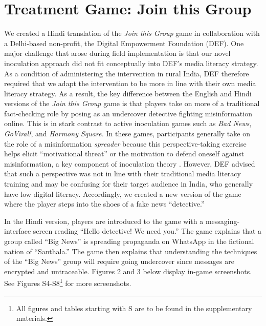 \documentclass[empirical, authordate]{jote-new-article}
\begin{document}
\section{Treatment Game: Join this Group}

We created a Hindi translation of the \emph{Join this Group} game in collaboration with a Delhi-based non-profit, the Digital Empowerment Foundation (DEF). One major challenge that arose during field implementation is that our novel inoculation approach did not fit conceptually into DEF's media literacy strategy. As a condition of administering the intervention in rural India, DEF therefore required that we adapt the intervention to be more in line with their own media literacy strategy. As a result,\emph{ }the key difference between the English and Hindi versions of the \emph{Join this Group }game is that players take on more of a traditional fact-checking role by posing as an undercover detective fighting misinformation online. This is in stark contrast to active inoculation games such as \emph{Bad News}, \emph{GoViral!}, and \emph{Harmony Square. }In these games, participants generally take on the role of a misinformation \emph{spreader} because this perspective-taking exercise helps elicit “motivational threat” or the motivation to defend oneself against misinformation, a key component of inoculation theory \parencite{Basol2021}. However, DEF advised that such a perspective was not in line with their traditional media literacy training and may be confusing for their target audience in India, who generally have low digital literacy. Accordingly, we created a new version of the game where the player steps into the shoes of a fake news “detective.”

In the Hindi version\emph{, }players are introduced to the game with a messaging-interface screen reading “Hello detective! We need you.” The game explains that a group called “Big News” is spreading propaganda on \mbox{WhatsApp} in the fictional nation of “Santhala.” The game then explains that understanding the techniques of the “Big News” group will require going undercover since messages are encrypted and untraceable. Figures 2 and 3 below display in-game screenshots. See Figures S4-S8\footnote{All figures and tables starting with S are to be found in the supplementary materials.} for more screenshots.
\end{document}
